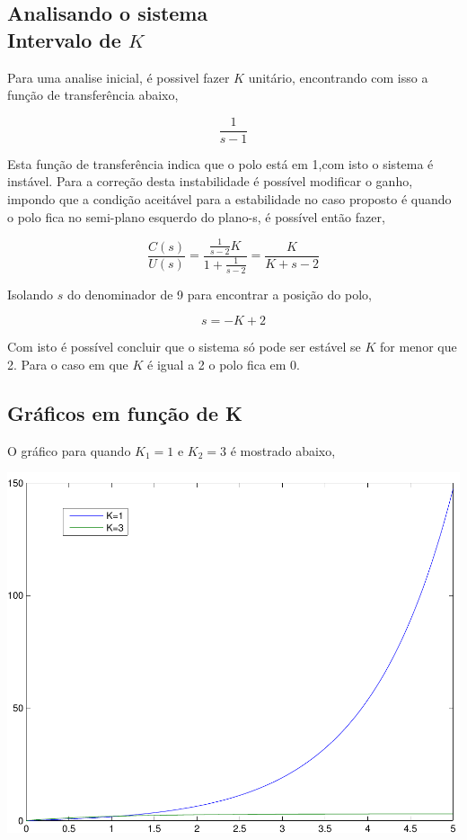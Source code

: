 \documentclass[paper=a4, fontsize=11pt]{article}
\begin{document}
\subsection{Analisando o sistema\\Intervalo de $K$}

Para uma analise inicial, é possivel fazer $K$ unitário, encontrando com isso a
função de transferência abaixo,

\begin{equation}
    \frac{1}{s-1}
\end{equation}

Esta função de transferência indica que o polo está em 1,com isto 
o sistema é instável. Para a correção desta instabilidade é possível
modificar o ganho, impondo que a condição aceitável para a estabilidade
no caso proposto é quando o polo fica no semi-plano esquerdo do plano-s, 
é possível então fazer,

\begin{equation}
    \frac{C(s)}{U(s)} = \frac{\frac{1}{s-2} K}{1 + \frac{1}{s-2} } = \frac{K}{K+s-2}
\end{equation}

Isolando $s$ do denominador de 9 para encontrar a posição do polo,

\begin{equation}
    s = - K + 2
\end{equation}

Com isto é possível concluir que o sistema só pode ser estável se $K$ for menor que 2.
Para o caso em que $K$ é igual a 2 o polo fica em 0.

\subsection{Gráficos em função de K}

O gráfico para quando $K_1=1$ e $K_2=3$ é mostrado abaixo,

\begin{center}
    \includegraphics[scale=0.5]{q3ib.pdf}
\end{center}
\end{document}
